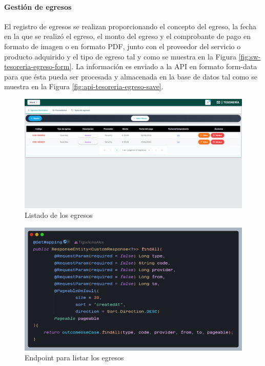 \paragraph{Gestión de egresos}

El registro de egresos se realizan proporcionando el concepto del egreso, la fecha en la que se realizó el egreso, el monto del egreso y el comprobante de pago en formato de imagen o en formato PDF, junto con el proveedor del servicio o producto adquirido y el tipo de egreso tal y como se muestra en la Figura \ref{fig:sw-tesoreria-egreso-form}.
La información es enviado a la API en formato form-data para que ésta pueda ser procesada y almacenada en la base de datos tal como se muestra en la Figura \ref{fig:api-tesoreria-egreso-save}.

\begin{figure}[H]
    \centering
    \includegraphics[width=1\textwidth]{resources/images/sw-tesoreria-egresos-listar}
    \caption{Listado de los egresos}
    \label{fig:sw-tesoreria-egreso-listar}
\end{figure}

\begin{figure}[H]
    \centering
    \includegraphics[width=1\textwidth]{resources/images/api-egreso-listar}
    \caption{Endpoint para listar los egresos}
    \label{fig:api-tesoreria-egresos-listar}
\end{figure}

